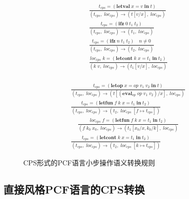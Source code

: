 \begin{figure}[htbp]
    \centering
    \begin{subfigure}[t]{0.43\textwidth}
        \begin{gather*}
            \displaystyle{\frac{t_{cps}=(\mathbf{letval}\; x=v\; \mathbf{in}\; t)} {(t_{cps},\; loc_{cps})\rightarrow (t [v/x],\; loc_{cps})}} \\
            \displaystyle{\frac{t_{cps}=(\mathbf{ifz}\; 0\; t_1\; t_2)} {(t_{cps},\; loc_{cps})\rightarrow (t_1,\; loc_{cps})}} \\
            \displaystyle{\frac{t_{cps}=(\mathbf{ifz}\; n\; t_1\; t_2)\quad n \neq 0} {(t_{cps},\; loc_{cps})\rightarrow (t_2,\; loc_{cps})}} \\
            \displaystyle{\frac{loc_{cps}\; k = (\mathbf{letcont}\; k\; x=t_1\; \mathbf{in}\; t_2)}{(k\; v,\; loc_{cps})\rightarrow (t_1 [v/x],\; loc_{cps})}} \\
        \end{gather*}
    \end{subfigure}
    \begin{subfigure}[t]{0.55\textwidth}
        \begin{gather*}
            \displaystyle{\frac{t_{cps}=(\mathbf{letop}\; x=op\; v_1\; v_2\; \mathbf{in}\; t)}
            {(t_{cps},\; loc_{cps})\rightarrow (t [(\mathbf{eval}_{op}\; op\; v_1\; v_2)/x],\; loc_{cps})}} \\
            \displaystyle{\frac{t_{cps}=(\mathbf{letfun}\; f\; k\; x=t_1\; \mathbf{in}\; t_2)} {(t_{cps},\; loc_{cps})\rightarrow (t_2,\; loc_{cps}\; [f\mapsto t_{cps}])}} \\
            \quad \displaystyle{\frac{loc_{cps}\; f = (\mathbf{letfun}\; f\; k\; x=t_1\; \mathbf{in}\; t_2)}{(f\; k_0\; x_0,\; loc_{cps})\rightarrow (t_1 [x_0/x, k_0/k],\; loc_{cps})}} \\
            \displaystyle{\frac{t_{cps}=(\mathbf{letcont}\; k\; x=t_1\; \mathbf{in}\; t_2)} {(t_{cps},\; loc_{cps})\rightarrow (t_2,\; loc_{cps}\; [k\mapsto t_{cps}])}} 
        \end{gather*}
    \end{subfigure}   
    \caption{CPS形式的PCF语言小步操作语义转换规则}\label{cpsopsem}
\end{figure}

\subsection{直接风格PCF语言的CPS转换} \label{sec:cpstrans}

